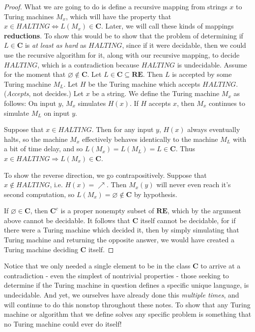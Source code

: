 \begin{proof}
    What we are going to do is define a recursive mapping from strings $x$ to Turing machines $M_x$, which will have the property that $x \in HALTING \iff L(M_x) \in \textbf{C}$. Later, we will call these kinds of mappings \textbf{reductions}. To show this would be to show that the problem of determining if $L \in \textbf{C}$ is \textit{at least as hard} as $HALTING$, since if it were decidable, then we could use the recursive algorithm for it, along with our recursive mapping, to decide $HALTING$, which is a contradiction because $HALTING$ is undecidable.
    Assume for the moment that $\varnothing \notin \textbf{C}$. Let $L \in \textbf{C} \subseteq \textbf{RE}$. Then $L$ is accepted by some Turing machine $M_L$. Let $H$ be the Turing machine which accepts $HALTING$. (\textit{Accepts}, not decides.) Let $x$ be a string. We define the Turing machine $M_x$ as follows: On input $y$, $M_x$ simulates $H(x)$. If $H$ accepts $x$, then $M_x$ continues to simulate $M_L$ on input $y$. 
    \par Suppose that $x \in HALTING$. Then for any input $y$, $H(x)$ always eventually halts, so the machine $M_x$ effectively behaves identically to the machine $M_L$ with a bit of time delay, and so $L(M_x) = L(M_L) = L \in \textbf{C}$. Thus $x \in HALTING \Rightarrow L(M_x) \in \textbf{C}$.
    \par To show the reverse direction, we go contrapositively. Suppose that $x \notin HALTING$, i.e.  $H(x) = \nearrow$. Then $M_x(y)$ will never even reach it's second computation, so $L(M_x) = \varnothing \notin \textbf{C}$ by hypothesis. 
    \par If $\varnothing \in \textbf{C}$, then $\textbf{C}^c$ is a proper nonempty subset of $\textbf{RE}$, which by the argument above cannot be decidable. It follows that \textbf{C} itself cannot be decidable, for if there were a Turing machine which decided it, then by simply simulating that Turing machine and returning the opposite answer, we would have created a Turing machine deciding \textbf{C} itself.
\end{proof}
Notice that we only needed a single element to be in the class \textbf{C} to arrive at a contradiction - even the simplest of nontrivial properties - those seeking to determine if the Turing machine in question defines a specific unique language, is undecidable. And yet, we ourselves have already done this \textit{multiple times}, and will continue to do this nonstop throughout these notes. To show that any Turing machine or algorithm that we define solves any specific problem is something that no Turing machine could ever do itself!
